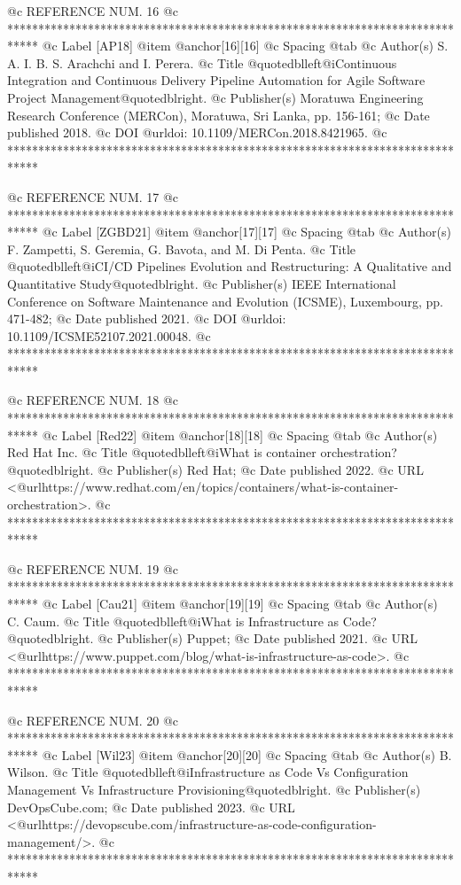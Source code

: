 @c REFERENCE NUM. 16
@c *****************************************************************************
@c Label [AP18]
@item @anchor{[16]}[16]
@c Spacing
@tab
@c Author(s)
S. A. I. B. S. Arachchi and I. Perera.
@c Title
@quotedblleft{}@i{Continuous Integration and Continuous Delivery Pipeline Automation for Agile Software Project Management}@quotedblright{}.
@c Publisher(s)
Moratuwa Engineering Research Conference (MERCon), Moratuwa, Sri Lanka, pp. 156-161;
@c Date published
2018.
@c DOI
@url{doi: 10.1109/MERCon.2018.8421965}.
@c *****************************************************************************

@c REFERENCE NUM. 17
@c *****************************************************************************
@c Label [ZGBD21]
@item @anchor{[17]}[17]
@c Spacing
@tab
@c Author(s)
F. Zampetti, S. Geremia, G. Bavota, and M. Di Penta.
@c Title
@quotedblleft{}@i{CI/CD Pipelines Evolution and Restructuring: A Qualitative and Quantitative Study}@quotedblright{}.
@c Publisher(s)
IEEE International Conference on Software Maintenance and Evolution (ICSME), Luxembourg, pp. 471-482;
@c Date published
2021.
@c DOI
@url{doi: 10.1109/ICSME52107.2021.00048}.
@c *****************************************************************************

@c REFERENCE NUM. 18
@c *****************************************************************************
@c Label [Red22]
@item @anchor{[18]}[18]
@c Spacing
@tab
@c Author(s)
Red Hat Inc.
@c Title
@quotedblleft{}@i{What is container orchestration?}@quotedblright{}.
@c Publisher(s)
Red Hat;
@c Date published
2022.
@c URL
<@url{https://www.redhat.com/en/topics/containers/what-is-container-orchestration}>.
@c *****************************************************************************

@c REFERENCE NUM. 19
@c *****************************************************************************
@c Label [Cau21]
@item @anchor{[19]}[19]
@c Spacing
@tab
@c Author(s)
C. Caum.
@c Title
@quotedblleft{}@i{What is Infrastructure as Code?}@quotedblright{}.
@c Publisher(s)
Puppet;
@c Date published
2021.
@c URL
<@url{https://www.puppet.com/blog/what-is-infrastructure-as-code}>.
@c *****************************************************************************

@c REFERENCE NUM. 20
@c *****************************************************************************
@c Label [Wil23]
@item @anchor{[20]}[20]
@c Spacing
@tab
@c Author(s)
B. Wilson.
@c Title
@quotedblleft{}@i{Infrastructure as Code Vs Configuration Management Vs Infrastructure Provisioning}@quotedblright{}.
@c Publisher(s)
DevOpsCube.com;
@c Date published
2023.
@c URL
<@url{https://devopscube.com/infrastructure-as-code-configuration-management/}>.
@c *****************************************************************************

